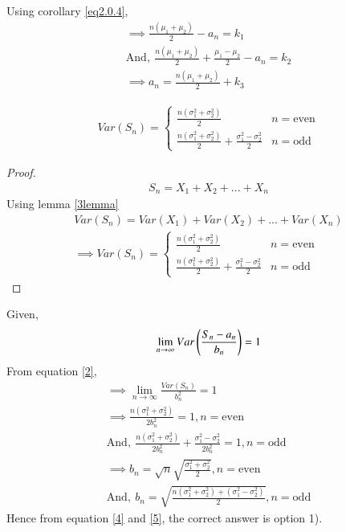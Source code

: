 \documentclass[journal,12pt,twocolumn]{IEEEtran}
\begin{document}
Using corollary \eqref{eq2.0.4}, 
\begin{align}
\implies \frac{n(\mu_1+\mu_2)}{2}-a_n=k_1\\
\mathrm{And,\:}\frac{n(\mu_1+\mu_2)}{2}+\frac{\mu_1-\mu_2}{2}-a_n=k_2\\
\boxed{\implies a_n=\frac{n(\mu_1+\mu_2)}{2}+k_3\label{5}}
\end{align}
\begin{corollary}
\begin{align}
Var(S_n)=
    \begin{cases}
    \frac{n(\sigma_1^2+\sigma_2^2)}{2} & n=\mathrm{even}\\
    \frac{n(\sigma_1^2+\sigma_2^2)}{2}+\frac{\sigma_1^2-\sigma_2^2}{2} & n=\mathrm{odd}
    \end{cases}
\end{align}
\end{corollary}
\begin{proof}
\begin{align}
S_n=X_1+X_2+...+X_n
\end{align}
Using lemma \eqref{3lemma}
\begin{align}
    Var(S_n)=Var(X_1)+Var(X_2)+...+Var(X_n)\\
    \implies Var(S_n)=
    \begin{cases}
    \frac{n(\sigma_1^2+\sigma_2^2)}{2} & n=\mathrm{even}\\
    \frac{n(\sigma_1^2+\sigma_2^2)}{2}+\frac{\sigma_1^2-\sigma_2^2}{2} & n=\mathrm{odd}
    \end{cases}
\end{align}
\end{proof}
Given,
\begin{align}
    \lim_{n\to\infty}Var\left(\frac{S_n-a_n}{b_n}\right)=1
\end{align}
From equation \eqref{2},
\begin{align}
    \implies \lim_{n\to\infty}\frac{Var(S_n)}{b_n^2}=1\\
    \implies \frac{n(\sigma_1^2+\sigma_2^2)}{2b_n^2}=1,n=\mathrm{even}\\
    \mathrm{And,\:}\frac{n(\sigma_1^2+\sigma_2^2)}{2b_n^2}+\frac{\sigma_1^2-\sigma_2^2}{2b_n^2}=1,n=\mathrm{odd}\\
    \boxed{\implies b_n=\sqrt{n}\sqrt{\frac{\sigma_1^2+\sigma_2^2}{2}},n=\mathrm{even}\label{4}}\\
    \mathrm{And,\:}b_n=\sqrt{\frac{n(\sigma_1^2+\sigma_2^2)+(\sigma_1^2-\sigma_2^2)}{2}},n=\mathrm{odd}
\end{align}
Hence from equation \eqref{4} and \eqref{5}, the correct answer is option 1).
\end{document}
